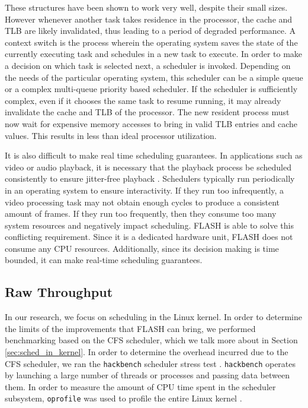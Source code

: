 \documentclass{sig-alternate-10pt}
\begin{document}
These structures have been shown to work very well, despite their small
sizes. However whenever another task takes residence in the processor, the
cache and TLB are likely invalidated, thus leading to a period of degraded
performance. A context switch is the process wherein the operating system
saves the state of the currently executing task and schedules in a new task
to execute. In order to make a decision on which task is selected next,
a scheduler is invoked. Depending on the needs of the particular operating
system, this scheduler can be a simple queue or a complex multi-queue
priority based scheduler. If the scheduler is sufficiently complex, even if
it chooses the same task to resume running, it may already invalidate the
cache and TLB of the processor. The new resident process must now wait for
expensive memory accesses to bring in valid TLB entries and cache values.
This results in less than ideal processor utilization.

It is also difficult to make real time scheduling guarantees. In applications such as video or audio playback, it is necessary that the playback process be scheduled consistently to ensure jitter-free playback \cite{groves2009bfs}. Schedulers typically run periodically in an operating system to ensure interactivity. If they run too infrequently, a video processing task may not obtain enough cycles to produce a consistent amount of frames. If they run too frequently, then they consume too many system resources and negatively impact scheduling. FLASH is able to solve this conflicting requirement. Since it is a dedicated hardware unit, FLASH does not consume any CPU resources. Additionally, since its decision making is time bounded, it can make real-time scheduling guarantees.

\subsection{Raw Throughput}
In our research, we focus on scheduling in the Linux kernel. In order to determine the limits of the improvements that FLASH can bring, we performed benchmarking based on the CFS scheduler, which we talk more about in Section \ref{sec:sched_in_kernel}. In order to determine the overhead incurred due to the CFS scheduler, we ran the \verb|hackbench| scheduler stress test \cite{hackbench}. \verb|hackbench| operates by launching a large number of threads or processes and passing data between them. In order to measure the amount of CPU time spent in the scheduler subsystem, \verb|oprofile| was used to profile the entire Linux kernel \cite{oprofile}.
\end{document}
